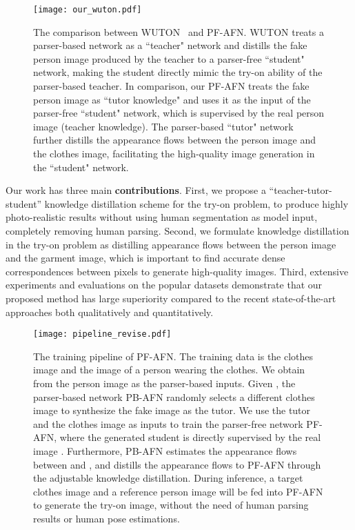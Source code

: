 \documentclass[final]{cvpr}
\begin{document}
	
	\begin{figure}[t]
		\begin{center}
			\texttt{[image: our\_wuton.pdf]}
		\end{center}
		\vspace{-3mm}
		\caption{The comparison between WUTON~\cite{parser_free} and PF-AFN. WUTON treats a parser-based network as a ``teacher" network and distills the fake person image produced by the teacher to a parser-free ``student" network, making the student directly mimic the try-on ability of the parser-based teacher. In comparison, our PF-AFN treats the fake person image as ``tutor knowledge" and uses it as the input of the parser-free ``student" network, which is supervised by the real person image (teacher knowledge). The parser-based ``tutor" network further distills the appearance flows between the person image and the clothes image, facilitating the high-quality image generation in the ``student" network.} 
		\vspace{-10pt}
		\label{fig:our_wuton}
	\end{figure}
	
Our work has three main \textbf{contributions}.
	First, we propose a ``teacher-tutor-student'' knowledge distillation scheme for the try-on problem, to produce highly photo-realistic results without using human segmentation as model input, completely removing human parsing.
Second, we formulate knowledge distillation in the try-on  problem as distilling appearance flows between the person image and the garment image, which is important to find accurate dense correspondences between pixels to generate high-quality images.
	Third, extensive experiments and evaluations on the popular  datasets demonstrate that our proposed method has large superiority compared to the recent state-of-the-art approaches both qualitatively and quantitatively.
	
	\begin{figure*}[t]
		\begin{center}
			\texttt{[image: pipeline\_revise.pdf]}
		\end{center}
		\vspace{-3mm}
		\caption{The training pipeline of PF-AFN. The training data is the clothes image  and the image  of a person wearing the clothes. We obtain  from the person image  as the parser-based inputs. Given , the parser-based network PB-AFN randomly selects a different clothes image  to synthesize the fake image  as the tutor. We use the tutor  and the clothes image  as inputs to train the parser-free network PF-AFN, where the generated student  is directly supervised by the real image . Furthermore, PB-AFN estimates the appearance flows  between  and , and distills the appearance flows to PF-AFN through the adjustable knowledge distillation. During inference, a target clothes image and a reference person image will be fed into PF-AFN to generate the try-on image, without the need of human parsing results or human pose estimations.}   
		\vspace{-10pt}
		\label{fig:pipeline}
	\end{figure*}
	
\end{document}
